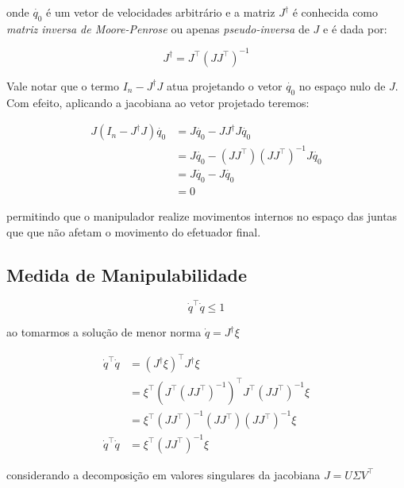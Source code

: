 onde \(\dot{q_0}\) é um vetor de velocidades arbitrário e a matriz \(J^\dag\) é
conhecida como \emph{matriz inversa de Moore-Penrose} ou apenas
\emph{pseudo-inversa} de \(J\) e é dada por:

\begin{equation}
    J^\dag = J^\top {(J J^\top)}^{-1}
\end{equation}

Vale notar que o termo \(I_n - J^\dag J\) atua projetando o vetor \(\dot{q_0}\)
no espaço nulo de \(J\). Com efeito, aplicando a jacobiana ao vetor projetado
teremos:

\begin{align*}
    J (I_n - J^\dag J) \dot{q_0} & = J \dot{q_0} - J J^\dag J \dot{q_0}                   \\
                                 & = J \dot{q_0} - (J J^\top) (J J^\top)^{-1} J \dot{q_0} \\
                                 & = J \dot{q_0} - J \dot{q_0}                            \\
                                 & = 0
\end{align*}

permitindo que o manipulador realize movimentos internos no
espaço das juntas que que não afetam o movimento do efetuador final.

\subsection{Medida de Manipulabilidade}

\begin{equation}
    \dot{q}^\top \dot{q} \leq 1
\end{equation}

ao tomarmos a solução de menor norma \(\dot{q} = J^\dag \xi\)

\begin{align*}
    \dot{q}^\top \dot{q} & = {(J^\dag \xi)}^\top J^\dag \xi                                          \\
                         & = \xi^\top {(J^\top {(J J^\top)}^{-1})}^\top J^\top {(J J^\top)}^{-1} \xi \\
                         & = \xi^\top {(J J^\top)}^{-1} (J J^\top) {(J J^\top)}^{-1} \xi             \\
    \dot{q}^\top \dot{q} & = \xi^\top {(J J^\top)}^{-1} \xi
\end{align*}

considerando a decomposição em valores singulares da jacobiana \(J = U \Sigma
V^\top\)

